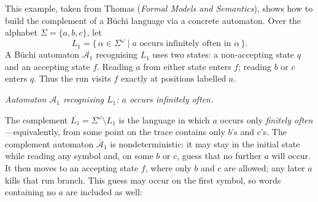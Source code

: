 \begin{example}
\label{ex:buchi-complement-thomas}
This example, taken from Thomas (\emph{Formal Models and Semantics}), shows how to build the complement of a B\"uchi language via a concrete automaton.  Over the alphabet $\Sigma=\{a,b,c\}$, let
\[
  L_1 = \{\,\alpha\in\Sigma^\omega \mid a\text{ occurs infinitely often in }\alpha\,\}.
\]
A B\"uchi automaton $\mathcal{A}_1$ recognising $L_1$ uses two states: a non-accepting state $q$ and an accepting state $f$.  Reading $a$ from either state enters $f$; reading $b$ or $c$ enters $q$.  Thus the run visits $f$ exactly at positions labelled $a$.

\begin{center}

\medskip
{\small\itshape Automaton $\mathcal{A}_1$ recognising $L_1$: $a$ occurs infinitely often.}
\end{center}

The complement $\overline{L_1} = \Sigma^\omega \setminus L_1$ is the language in which $a$ occurs only \emph{finitely often}---equivalently, from some point on the trace contains only $b$'s and $c$'s.  The complement automaton $\bar{\mathcal{A}}_1$ is nondeterministic: it may stay in the initial state while reading any symbol and, on some $b$ or $c$, guess that no further $a$ will occur.  It then moves to an accepting state $f$, where only $b$ and $c$ are allowed; any later $a$ kills that run branch.  This guess may occur on the first symbol, so words containing no $a$ are included as well:

\begin{center}


\end{center}
\end{example}
